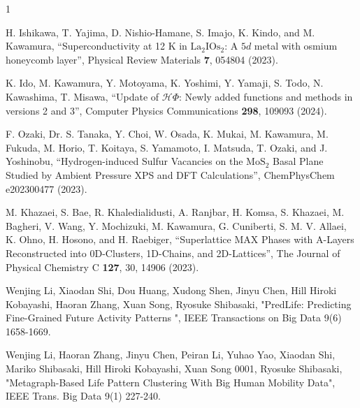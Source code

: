 


\begin{雑誌論文}{1}


H. Ishikawa, T. Yajima, D. Nishio-Hamane, S. Imajo, K. Kindo, and M. Kawamura,
``Superconductivity at 12 K in ${\mathrm{La}}_{2}{\mathrm{IOs}}_{2}$: A $5d$ metal with osmium honeycomb layer'',
Physical Review Materials \textbf{7}, 054804 (2023).

K. Ido, M. Kawamura, Y. Motoyama, K. Yoshimi, Y. Yamaji, S. Todo, N. Kawashima, T. Misawa,
``Update of $\mathcal{H}\Phi$: Newly added functions and methods in versions 2 and 3'',
Computer Physics Communications \textbf{298}, 109093 (2024).

F. Ozaki, Dr. S. Tanaka, Y. Choi, W. Osada, K. Mukai, M. Kawamura, M. Fukuda, M. Horio, T. Koitaya, S. Yamamoto, I. Matsuda, T. Ozaki, and J. Yoshinobu,
``Hydrogen-induced Sulfur Vacancies on the $\mathrm{MoS}_2$ Basal Plane Studied by Ambient Pressure XPS and DFT Calculations'',
ChemPhysChem e202300477 (2023).

M. Khazaei, S. Bae, R. Khaledialidusti, A. Ranjbar, H. Komsa, S. Khazaei, M. Bagheri, V. Wang, Y. Mochizuki, M. Kawamura, G. Cuniberti, S. M. V. Allaei, K. Ohno, H. Hosono, and H. Raebiger, 
``Superlattice MAX Phases with A-Layers Reconstructed into 0D-Clusters, 1D-Chains, and 2D-Lattices'',
The Journal of Physical Chemistry C \textbf{127}, 30, 14906 (2023).

 Wenjing Li, Xiaodan Shi, Dou Huang, Xudong Shen, Jinyu Chen, Hill Hiroki Kobayashi, Haoran Zhang, Xuan Song, Ryosuke Shibasaki,  "PredLife: Predicting Fine-Grained Future Activity Patterns ", IEEE Transactions on Big Data 9(6) 1658-1669.

 Wenjing Li, Haoran Zhang, Jinyu Chen, Peiran Li, Yuhao Yao, Xiaodan Shi, Mariko Shibasaki, Hill Hiroki Kobayashi, Xuan Song 0001, Ryosuke Shibasaki,  "Metagraph-Based Life Pattern Clustering With Big Human Mobility Data", IEEE Trans. Big Data 9(1) 227-240.
 

\end{雑誌論文}

